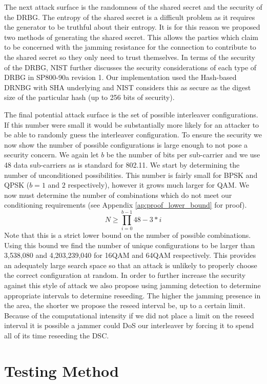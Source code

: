 \documentclass[sigconf]{acmart}
\begin{document}
The next attack surface is the randomness of the shared secret and the security of the DRBG. The entropy of the shared secret is a difficult problem as it requires the generator to be truthful about their entropy. It is for this reason we proposed two methods of generating the shared secret. This allows the parties which claim to be concerned with the jamming resistance for the connection to contribute to the shared secret so they only need to trust themselves. In terms of the security of the DRBG, NIST further discusses the security considerations of each type of DRBG in SP800-90a revision 1\cite{barker2015nist90a}. Our implementation used the Hash-based DRNBG with SHA underlying and NIST considers this as secure as the digest size of the particular hash (up to 256 bits of security). 

The final potential attack surface is the set of possible interleaver configurations. If this number were small it would be substantially more likely for an attacker to be able to randomly guess the interleaver configuration. To ensure the security we now show the number of possible configurations is large enough to not pose a security concern. We again let $b$ be the number of bits per sub-carrier and we use 48 data sub-carriers as is standard for 802.11. We start by determining the number of unconditioned possibilities. This number is fairly small for BPSK and QPSK ($b= 1$ and $2$ respectively), however it grows much larger for QAM. We now must determine the number of combinations which do not meet our conditioning requirements (see Appendix \ref{ap:proof_lower_bound} for proof). 
$$N \geq \prod_{i=0}^{b-1} 48 - 3*i$$
Note that this is a strict lower bound on the number of possible combinations. Using this bound we find the number of unique configurations to be larger than 3,538,080 and 4,203,239,040 for 16QAM and 64QAM respectively.  This provides an adequately large search space so that an attack is unlikely to properly choose the correct configuration at random. In order to further increase the security against this style of attack we also propose using jamming detection to determine appropriate intervals to determine reseeding. The higher the jamming presence in the area, the shorter we propose the reseed interval be, up to a certain limit. Because of the computational intensity if we did not place a limit on the reseed interval it is possible a jammer could DoS our interleaver by forcing it to spend all of its time reseeding the DSC. 

\section{Testing Method}
\label{sec:testing}
\end{document}
